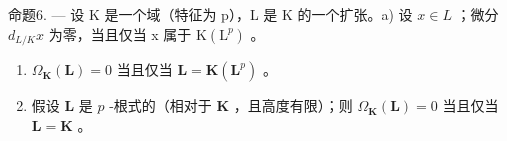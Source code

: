 命题6. --- 设 K 是一个域（特征为 p），L 是 K 的一个扩张。a) 设 \(x \in L\) ；微分 \(d_{L/K}x\) 为零，当且仅当 x 属于 \(\mathrm{K}(\mathrm{L}^{p})\) 。

\begin{enumerate}
\def\labelenumi{\alph{enumi})}
\setcounter{enumi}{1}
\item
  \(\Omega_{\mathbf{K}}(\mathbf{L}) = 0\) 当且仅当 \(\mathbf{L} = \mathbf{K}(\mathbf{L}^p)\) 。
\item
  假设 \(\mathbf{L}\) 是 \(p\) -根式的（相对于 \(\mathbf{K}\) ，且高度有限）；则 \(\Omega_{\mathbf{K}}(\mathbf{L}) = 0\) 当且仅当 \(\mathbf{L} = \mathbf{K}\) 。
\end{enumerate}

